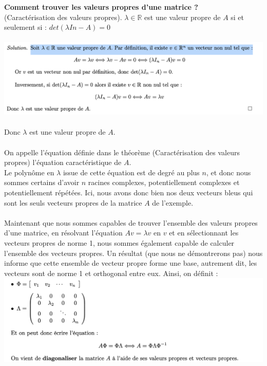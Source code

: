                     \textbf{Comment trouver les valeurs propres d’une matrice ?}
                    \\
                    (Caractérisation des valeurs propres). $\lambda \in \mathbb{R}$ est une valeur propre de $A$ si et seulement si :
                        $det(\lambda In - A) = 0$
                    \\
                    \\
                    \includegraphics[width=\linewidth]{./img/reduction_dim/pca/prv_val_prp}
                    \\
                    \\
                    Donc $\lambda$ est une valeur propre de $A$.
                    \\
                    \\
                    On appelle l’équation définie dans le théorème (Caractérisation des valeurs propres) l’équation caractéristique de $A$.
                    \\
                    Le polynôme en $\lambda$ issue de cette équation est de degré au plus $n$, et donc nous sommes certains d’avoir $n$ racines complexes, potentiellement complexes et potentiellement répétées. Ici, nous avons donc bien nos deux vecteurs bleus qui sont les seuls vecteurs propres de la matrice $A$ de l’exemple.
                    \\
                    \\
                    Maintenant que nous sommes capables de trouver l’ensemble des valeurs propres d’une matrice, en résolvant l’équation $Av = \lambda v$ en $v$ et en sélectionnant les vecteurs propres de norme 1, nous sommes également capable de calculer l’ensemble des vecteurs propres.
                    Un résultat (que nous ne démontrerons pas) nous informe que cette ensemble de vecteur propre forme une base, autrement dit, les vecteurs sont de norme 1 et orthogonal entre eux. Ainsi, on définit :
                    \\
                    \includegraphics[width=\linewidth]{./img/reduction_dim/pca/mat_diag}
